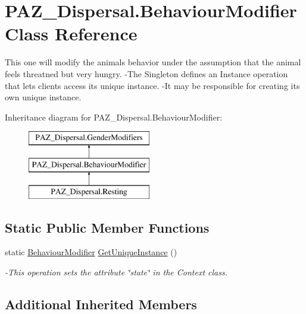 \hypertarget{class_p_a_z___dispersal_1_1_behaviour_modifier}{\section{P\-A\-Z\-\_\-\-Dispersal.\-Behaviour\-Modifier Class Reference}
\label{class_p_a_z___dispersal_1_1_behaviour_modifier}
}


This one will modify the animals behavior under the assumption that the animal feels threatned but very hungry. -\/\-The Singleton defines an Instance operation that lets clients access its unique instance. -\/\-It may be responsible for creating its own unique instance.  


Inheritance diagram for P\-A\-Z\-\_\-\-Dispersal.\-Behaviour\-Modifier\-:\begin{figure}[H]
\begin{center}
\leavevmode
\includegraphics[height=3.000000cm]{class_p_a_z___dispersal_1_1_behaviour_modifier}
\end{center}
\end{figure}
\subsection*{Static Public Member Functions}
\begin{DoxyCompactItemize}
\item 
static \hyperlink{class_p_a_z___dispersal_1_1_behaviour_modifier}{Behaviour\-Modifier} \hyperlink{class_p_a_z___dispersal_1_1_behaviour_modifier_adba2ac81bae83c4606a5f035a49a763c}{Get\-Unique\-Instance} ()
\begin{DoxyCompactList}\small\item\em -\/\-This operation sets the attribute \char`\"{}state\char`\"{} in the Context class. \end{DoxyCompactList}\end{DoxyCompactItemize}
\subsection*{Additional Inherited Members}


